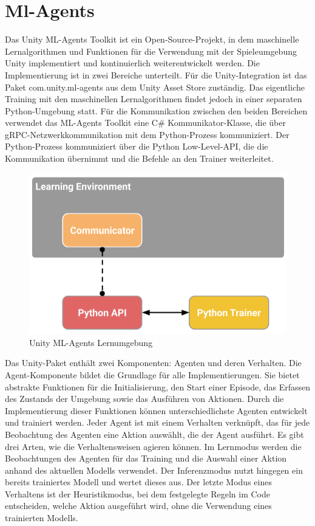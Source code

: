 {\chapter{Ml-Agents}}
\label{sec:mlagents}
Das Unity ML-Agents Toolkit ist ein Open-Source-Projekt, in dem maschinelle Lernalgorithmen und Funktionen für die Verwendung mit der Spieleumgebung Unity implementiert und kontinuierlich weiterentwickelt werden. Die Implementierung ist in zwei Bereiche unterteilt. Für die Unity-Integration ist das Paket com.unity.ml-agents aus dem Unity Asset Store zuständig. Das eigentliche Training mit den maschinellen Lernalgorithmen findet jedoch in einer separaten Python-Umgebung statt. Für die Kommunikation zwischen den beiden Bereichen verwendet das ML-Agents Toolkit eine C\# Kommunikator-Klasse, die über gRPC-Netzwerkkommunikation mit dem Python-Prozess kommuniziert. Der Python-Prozess kommuniziert über die Python Low-Level-API, die die Kommunikation übernimmt und die Befehle an den Trainer weiterleitet.\cite{unity_mlagents_toolkit_overview}

\begin{figure}[htb]
  \centering  
  \includegraphics[scale=0.4]{img/learning_environment_basic.png}
  \caption{Unity ML-Agents Lernumgebung \protect\cite{unity_mlagents_learning_environment_basic}}
  \label{fig:learning_environment_basic}
\end{figure}

Das Unity-Paket enthält zwei Komponenten: Agenten und deren Verhalten. Die Agent-Komponente bildet die Grundlage für alle Implementierungen. Sie bietet abstrakte Funktionen für die Initialisierung, den Start einer Episode, das Erfassen des Zustands der Umgebung sowie das Ausführen von Aktionen. Durch die Implementierung dieser Funktionen können unterschiedlichste Agenten entwickelt und trainiert werden. Jeder Agent ist mit einem Verhalten verknüpft, das für jede Beobachtung des Agenten eine Aktion auswählt, die der Agent ausführt. Es gibt drei Arten, wie die Verhaltensweisen agieren können. Im Lernmodus werden die Beobachtungen des Agenten für das Training und die Auswahl einer Aktion anhand des aktuellen Modells verwendet. Der Inferenzmodus nutzt hingegen ein bereits trainiertes Modell und wertet dieses aus. Der letzte Modus eines Verhaltens ist der Heuristikmodus, bei dem festgelegte Regeln im Code entscheiden, welche Aktion ausgeführt wird, ohne die Verwendung eines trainierten Modells.\cite{unity_mlagents_toolkit_overview}


